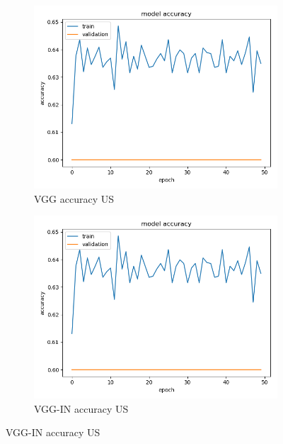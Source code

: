 \begin{figure}[h]
\begin{subfigure}[b]{.24\linewidth}
\includegraphics[width=\linewidth]{Figs/vgg_us_acc.jpg}
\caption{VGG accuracy US}
\end{subfigure}
\begin{subfigure}[b]{.24\linewidth}
\includegraphics[width=\linewidth]{Figs/vgg_us_acc.jpg}
\caption{VGG-IN accuracy US}
\end{subfigure}


\end{figure}
